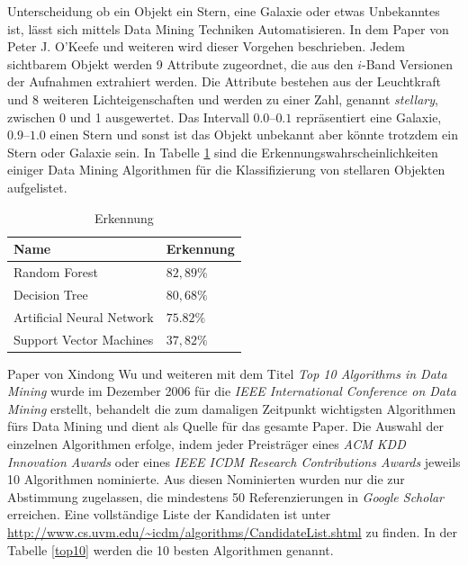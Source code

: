 \documentclass[12pt,journal,compsoc]{IEEEtran}
\begin{document}
 Unterscheidung ob ein Objekt ein Stern, eine Galaxie oder etwas Unbekanntes ist, lässt sich
mittels Data Mining Techniken Automatisieren. In dem Paper \cite{o2009star} von Peter J. O’Keefe und weiteren
wird dieser Vorgehen beschrieben. Jedem sichtbarem Objekt werden 9 Attribute zugeordnet, die aus den 
$i$-Band Versionen der Aufnahmen extrahiert werden. Die Attribute bestehen aus der Leuchtkraft und 8 weiteren Lichteigenschaften
und werden zu einer Zahl, genannt \emph{stellary}, zwischen 0 und 1 ausgewertet. Das Intervall $0.0$--$0.1$ repräsentiert eine Galaxie, $0.9$--$1.0$ einen 
Stern und sonst ist das Objekt unbekannt aber könnte trotzdem ein Stern oder Galaxie sein. In Tabelle \ref{Erkennungswahrscheinlichkeiten} sind die Erkennungswahrscheinlichkeiten einiger 
Data Mining Algorithmen für die Klassifizierung von stellaren Objekten aufgelistet.

\begin{table}[!h]
\centering
\label{Erkennungswahrscheinlichkeiten}
\caption{Erkennung \cite{o2009star}}
\begin{tabular}{l|l}
Name & Erkennung\\ \hline
Random Forest & $82,89\%$ \\
Decision Tree & $80,68\%$ \\
Artificial Neural Network & $75.82\%$ \\
Support Vector Machines & $37,82\%$
\end{tabular}
\end{table}

 Paper \cite{wu2008top} von Xindong Wu und weiteren mit dem Titel \emph{Top 10 Algorithms in Data Mining} wurde 
im Dezember 2006 für die \emph{IEEE International Conference on Data Mining} erstellt, behandelt die zum damaligen 
Zeitpunkt wichtigsten Algorithmen fürs Data Mining und dient als Quelle für das gesamte Paper. Die Auswahl der einzelnen Algorithmen erfolge, indem jeder 
Preisträger eines \emph{ACM KDD Innovation Awards} oder eines \emph{IEEE ICDM Research Contributions Awards} jeweils 
10 Algorithmen nominierte. Aus diesen Nominierten wurden nur die zur Abstimmung zugelassen, die mindestens 50 
Referenzierungen in \emph{Google Scholar} erreichen. Eine vollständige Liste der Kandidaten ist unter \url{http://www.cs.uvm.edu/~icdm/algorithms/CandidateList.shtml}
zu finden. In der Tabelle \ref{top10} werden die 10 besten Algorithmen genannt.
\end{document}
